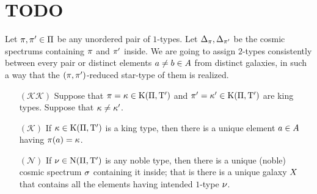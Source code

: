 \section{TODO}
Let $\pi,{\pi'}\in\Pi$ be any unordered pair of $1$-types. Let
$\Delta_\pi, \Delta_{\pi'}$ be the cosmic spectrums containing $\pi$ and
${\pi'}$ inside.
We are going to assign $2$-types consistently between every pair or distinct
elements $a\neq b \in A$ from distinct galaxies, in such a way that the
$(\pi,{\pi'})$-reduced star-type of them is realized.
\begin{itemize}
  \item[$(\mathcal{K}\mathcal{K})$] Suppose that $\pi = \kappa \in
  \mathrm{K}(\Pi,{\mathrm{T}'})$ and ${\pi'} = {\kappa'} \in \mathrm{K}(\Pi,{\mathrm{T}'})$ are king types.
  Suppose that $\kappa \neq {\kappa'}$.
  \item[$(\mathcal{K})$]
    If $\kappa \in \mathrm{K}(\Pi,{\mathrm{T}'})$ is a king type, then there is a unique
    element $a \in A$ having $\pi(a) = \kappa$.
  \item[$(\mathcal{N})$] If $\nu \in \mathrm{\mathrm{N}}(\Pi,{\mathrm{T}'})$ is any noble type, then
  there is a unique (noble) cosmic spectrum $\sigma$ containing it inside; that
  is there is a unique galaxy $X$ that contains all the elements having
  intended $1$-type $\nu$.
\end{itemize}















